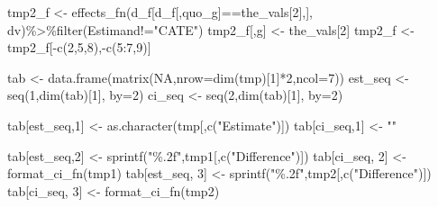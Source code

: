 \documentclass[
]{article}
\newenvironment{Shaded}{\begin{snugshade}}{\end{snugshade}}
\newcommand{\AttributeTok}[1]{\textcolor[rgb]{0.77,0.63,0.00}{#1}}
\newcommand{\ConstantTok}[1]{\textcolor[rgb]{0.00,0.00,0.00}{#1}}
\newcommand{\DecValTok}[1]{\textcolor[rgb]{0.00,0.00,0.81}{#1}}
\newcommand{\FunctionTok}[1]{\textcolor[rgb]{0.00,0.00,0.00}{#1}}
\newcommand{\NormalTok}[1]{#1}
\newcommand{\OtherTok}[1]{\textcolor[rgb]{0.56,0.35,0.01}{#1}}
\newcommand{\SpecialCharTok}[1]{\textcolor[rgb]{0.00,0.00,0.00}{#1}}
\newcommand{\StringTok}[1]{\textcolor[rgb]{0.31,0.60,0.02}{#1}}
\begin{document}
\begin{Shaded}
\begin{Highlighting}[]
\NormalTok{  tmp2\_f }\OtherTok{\textless{}{-}} \FunctionTok{effects\_fn}\NormalTok{(d\_f[d\_f[,quo\_g]}\SpecialCharTok{==}\NormalTok{the\_vals[}\DecValTok{2}\NormalTok{],], dv)}\SpecialCharTok{\%\textgreater{}\%}\FunctionTok{filter}\NormalTok{(Estimand}\SpecialCharTok{!=}\StringTok{"CATE"}\NormalTok{)}
\NormalTok{  tmp2\_f[,g] }\OtherTok{\textless{}{-}}\NormalTok{ the\_vals[}\DecValTok{2}\NormalTok{]}
\NormalTok{  tmp2\_f }\OtherTok{\textless{}{-}}\NormalTok{ tmp2\_f[}\SpecialCharTok{{-}}\FunctionTok{c}\NormalTok{(}\DecValTok{2}\NormalTok{,}\DecValTok{5}\NormalTok{,}\DecValTok{8}\NormalTok{),}\SpecialCharTok{{-}}\FunctionTok{c}\NormalTok{(}\DecValTok{5}\SpecialCharTok{:}\DecValTok{7}\NormalTok{,}\DecValTok{9}\NormalTok{)]}

  
\NormalTok{  tab }\OtherTok{\textless{}{-}} \FunctionTok{data.frame}\NormalTok{(}\FunctionTok{matrix}\NormalTok{(}\ConstantTok{NA}\NormalTok{,}\AttributeTok{nrow=}\FunctionTok{dim}\NormalTok{(tmp)[}\DecValTok{1}\NormalTok{]}\SpecialCharTok{*}\DecValTok{2}\NormalTok{,}\AttributeTok{ncol=}\DecValTok{7}\NormalTok{))}
\NormalTok{  est\_seq }\OtherTok{\textless{}{-}} \FunctionTok{seq}\NormalTok{(}\DecValTok{1}\NormalTok{,}\FunctionTok{dim}\NormalTok{(tab)[}\DecValTok{1}\NormalTok{], }\AttributeTok{by=}\DecValTok{2}\NormalTok{)}
\NormalTok{  ci\_seq }\OtherTok{\textless{}{-}} \FunctionTok{seq}\NormalTok{(}\DecValTok{2}\NormalTok{,}\FunctionTok{dim}\NormalTok{(tab)[}\DecValTok{1}\NormalTok{], }\AttributeTok{by=}\DecValTok{2}\NormalTok{)}
  
\NormalTok{  tab[est\_seq,}\DecValTok{1}\NormalTok{] }\OtherTok{\textless{}{-}} \FunctionTok{as.character}\NormalTok{(tmp[,}\FunctionTok{c}\NormalTok{(}\StringTok{"Estimate"}\NormalTok{)])}
\NormalTok{  tab[ci\_seq,}\DecValTok{1}\NormalTok{] }\OtherTok{\textless{}{-}} \StringTok{""}
  
\NormalTok{  tab[est\_seq,}\DecValTok{2}\NormalTok{] }\OtherTok{\textless{}{-}} \FunctionTok{sprintf}\NormalTok{(}\StringTok{"\%.2f"}\NormalTok{,tmp1[,}\FunctionTok{c}\NormalTok{(}\StringTok{"Difference"}\NormalTok{)])}
\NormalTok{  tab[ci\_seq, }\DecValTok{2}\NormalTok{] }\OtherTok{\textless{}{-}} \FunctionTok{format\_ci\_fn}\NormalTok{(tmp1)}
\NormalTok{  tab[est\_seq, }\DecValTok{3}\NormalTok{] }\OtherTok{\textless{}{-}} \FunctionTok{sprintf}\NormalTok{(}\StringTok{"\%.2f"}\NormalTok{,tmp2[,}\FunctionTok{c}\NormalTok{(}\StringTok{"Difference"}\NormalTok{)])}
\NormalTok{  tab[ci\_seq, }\DecValTok{3}\NormalTok{] }\OtherTok{\textless{}{-}} \FunctionTok{format\_ci\_fn}\NormalTok{(tmp2)}
  

\end{Highlighting}
\end{Shaded}
\end{document}
